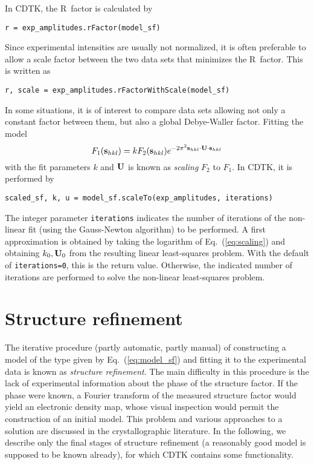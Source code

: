 \documentclass[11pt]{article}
\newcommand{\vect}[1]{{\bf #1}}
\newcommand{\mat}[1]{{\bf #1}}
\newcommand{\vs}{\vect{s}}
\newcommand{\mU}{\mat{U}}
\begin{document}
\begin{sloppy}
In CDTK, the R~factor is calculated by
\begin{verbatim}
r = exp_amplitudes.rFactor(model_sf)
\end{verbatim}
Since experimental intensities are usually not normalized, it is often
preferable to allow a scale factor between the two data sets that
minimizes the R~factor. This is written as
\begin{verbatim}
r, scale = exp_amplitudes.rFactorWithScale(model_sf)
\end{verbatim}

In some situations, it is of interest to compare data sets allowing not only
a constant factor between them, but also a global Debye-Waller factor.
Fitting the model
\begin{equation}
\label{eq:scaling}
F_1(\vs_{hkl}) = k F_2(\vs_{hkl}) e^{-2\pi^2 \vs_{hkl}\cdot\mU\cdot\vs_{hkl}}
\end{equation}
with the fit parameters $k$ and $\mU$ is known as \textit{scaling} $F_2$
to $F_1$. In CDTK, it is performed by
\begin{verbatim}
scaled_sf, k, u = model_sf.scaleTo(exp_amplitudes, iterations)
\end{verbatim}
The integer parameter \verb/iterations/ indicates the number of iterations
of the non-linear fit (using the Gauss-Newton algorithm) to be performed.
A first approximation is obtained by taking the logarithm of 
Eq.~(\ref{eq:scaling}) and obtaining $k_0, \mU_0$ from the resulting
linear least-squares problem. With the default of \verb/iterations=0/,
this is the return value. Otherwise, the indicated number of iterations
are performed to solve the non-linear least-squares problem.


\section{Structure refinement}

The iterative procedure (partly automatic, partly manual) of
constructing a model of the type given by Eq.~(\ref{eq:model_sf}) and
fitting it to the experimental data is known as \textit{structure
  refinement}. The main difficulty in this procedure is the lack of
experimental information about the phase of the structure factor. If
the phase were known, a Fourier transform of the measured structure
factor would yield an electronic density map, whose visual inspection
would permit the construction of an initial model. This problem and
various approaches to a solution are discussed in the crystallographic
literature. In the following, we describe only the final stages of
structure refinement (a reasonably good model is supposed to be known
already), for which CDTK contains some functionality.


\end{sloppy}
\end{document}
